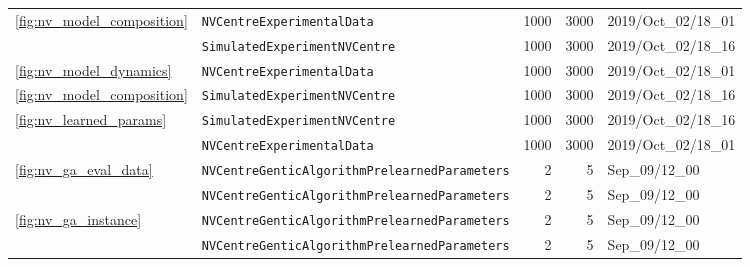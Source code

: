 \begin{tabular}{llrrl}
\cline{1-5}
\multirow{2}{*}{\cref{fig:nv_model_composition}} & \texttt{NVCentreExperimentalData} &                                     1000 &                                     3000 &                      2019/Oct\_02/18\_01 \\
                          & \texttt{SimulatedExperimentNVCentre} &                                     1000 &                                     3000 &                      2019/Oct\_02/18\_16 \\
\cline{1-5}
\cref{fig:nv_model_dynamics} & \texttt{NVCentreExperimentalData} &                                     1000 &                                     3000 &                      2019/Oct\_02/18\_01 \\
\cref{fig:nv_model_composition} & \texttt{SimulatedExperimentNVCentre} &                                     1000 &                                     3000 &                      2019/Oct\_02/18\_16 \\
\multirow{2}{*}{\cref{fig:nv_learned_params}} & \texttt{SimulatedExperimentNVCentre} &                                     1000 &                                     3000 &                      2019/Oct\_02/18\_16 \\
                          & \texttt{NVCentreExperimentalData} &                                     1000 &                                     3000 &                      2019/Oct\_02/18\_01 \\
\cline{1-5}
\multirow{2}{*}{\cref{fig:nv_ga_eval_data}} & \texttt{NVCentreGenticAlgorithmPrelearnedParameters} &                                        2 &                                        5 &                           Sep\_09/12\_00 \\
                          & \texttt{NVCentreGenticAlgorithmPrelearnedParameters} &                                        2 &                                        5 &                           Sep\_09/12\_00 \\
\cline{1-5}
\multirow{2}{*}{\cref{fig:nv_ga_instance}} & \texttt{NVCentreGenticAlgorithmPrelearnedParameters} &                                        2 &                                        5 &                           Sep\_09/12\_00 \\
                          & \texttt{NVCentreGenticAlgorithmPrelearnedParameters} &                                        2 &                                        5 &                           Sep\_09/12\_00 \\
\hline
\end{tabular}
